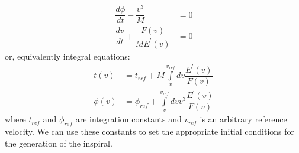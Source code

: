 \documentclass[aps,
prd,
amsmath,
amssymb,
twocolumn,
floatfix,
groupedaddress]{revtex4-1}
\newcommand{\Int}{\displaystyle\int\limits}
\begin{document}
\begin{align}\label{eq:PNOrbitalEvolution01}\nonumber
\dfrac{d\phi}{dt} - \dfrac{v^3}{M} &= 0\\
\dfrac{dv}{dt} + \dfrac{F(v)}{ME^{\prime}(v)} &= 0
\end{align}
or, equivalently integral equations:
\begin{align}\label{eq:PNOrbitalEvolution02}\nonumber
t(v) &= t_{ref} + M\Int_v^{v_{ref}}dv\dfrac{E^{\prime}(v)}{F(v)}\\
\phi(v) &= \phi_{ref} + \Int_v^{v_{ref}}dv v^3\dfrac{E^{\prime}(v)}{F(v)}
\end{align}
where $t_{ref}$ and $\phi_{ref}$ are integration constants and $v_{ref}$ is an arbitrary reference velocity. We can use these constants to set the appropriate initial conditions for the generation of the inspiral.
%
%
%
%
\end{document}

